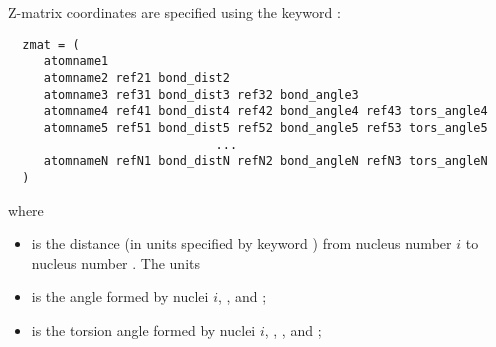 \noindent
Z-matrix coordinates are specified using the keyword :
\begin{verbatim}
  zmat = (
     atomname1
     atomname2 ref21 bond_dist2
     atomname3 ref31 bond_dist3 ref32 bond_angle3 
     atomname4 ref41 bond_dist4 ref42 bond_angle4 ref43 tors_angle4 
     atomname5 ref51 bond_dist5 ref52 bond_angle5 ref53 tors_angle5 
                             ...                
     atomnameN refN1 bond_distN refN2 bond_angleN refN3 tors_angleN 
  )
\end{verbatim}
where
\begin{itemize}
\item {} is the distance (in units specified by
keyword ) from nucleus number $i$ to
nucleus number . The units 
\item {} is the angle formed by nuclei $i$,
, and ;
\item {} is the torsion angle formed by nuclei $i$,
, , and ;
\end{itemize}

